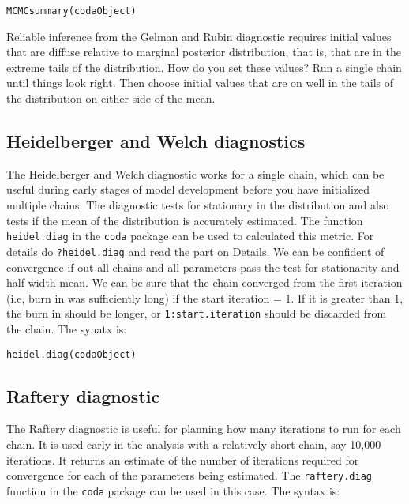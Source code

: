 \documentclass[12pt,english]{article}
\begin{document}
\begin{Verbatim}
MCMCsummary(codaObject)
\end{Verbatim}


Reliable inference from the Gelman and Rubin diagnostic requires initial values that are diffuse relative to marginal posterior distribution, that is, that are in the extreme tails of the distribution. How do you set these values? Run a single chain until things look right. Then choose initial values that are on well in the tails of the distribution on either side of the mean.

\subsection{Heidelberger and Welch diagnostics}

The Heidelberger and Welch diagnostic \citep{Heidelberger_and_Welch} works for a single chain, which can be useful during early stages of model development before you have initialized multiple chains. The diagnostic tests for stationary in the distribution and also tests if the mean of the distribution is accurately estimated. The function \texttt{heidel.diag} in the \texttt{coda} package can be used to calculated this metric. For details do \texttt{?heidel.diag} and read the part on Details. We can be confident of convergence if out all chains and all parameters pass the test for stationarity and half width mean. We can be sure that the chain converged from the first iteration (i.e, burn in was sufficiently long) if the start iteration = 1. If it is greater than 1, the burn in should be longer, or \texttt{1:start.iteration} should be discarded from the chain. The synatx is:

\begin{Verbatim}
heidel.diag(codaObject)
\end{Verbatim}

\subsection{Raftery diagnostic}

The Raftery diagnostic \citet{Raftery_et_al1995} is useful for planning how many iterations to run for each chain. It is used early in the analysis with a relatively short chain, say 10,000 iterations. It returns an estimate of the number of iterations required for convergence for each of the parameters being estimated. The \texttt{raftery.diag} function in the \texttt{coda} package can be used in this case. The syntax is:
\end{document}

